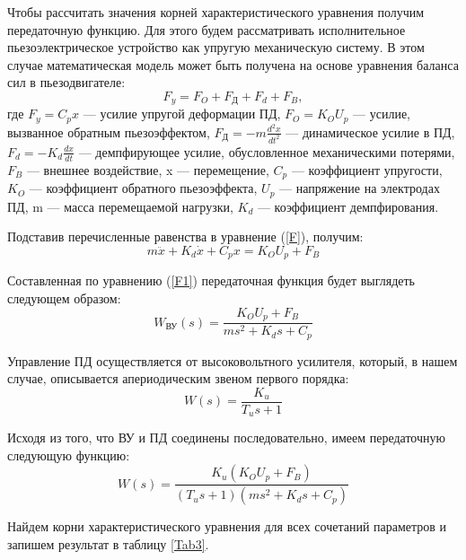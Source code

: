 \documentclass[a4paper,12pt]{article} %
\begin{document}
Чтобы рассчитать значения корней характеристического уравнения получим передаточную функцию. Для этого будем рассматривать исполнительное пьезоэлектрическое устройство как упругую механическую систему. В этом случае математическая модель может быть получена на основе уравнения баланса сил в пьезодвигателе:  
\begin{equation} 
    F_y = F_O + F_\text{Д} + F_d + F_B,
    \label{F}
\end{equation}
где $F_y=C_px$ --- усилие упругой деформации ПД, $F_O=K_OU_p$ --- усилие, вызванное обратным пьезоэффектом, $F_\text{Д}=-m\displaystyle{\frac{d^2x}{dt^2}}$ --- динамическое усилие в ПД, $F_d=-K_d\displaystyle{\frac{dx}{dt}}$ --- демпфирующее усилие, обусловленное механическими потерями, $F_B$ --- внешнее воздействие, x --- перемещение, $C_p$ --- коэффициент упругости, $K_O$ --- коэффициент обратного пьезоэффекта, $U_p$ --- напряжение на электродах ПД, m --- масса перемещаемой нагрузки, $K_d$ --- коэффициент демпфирования.\par
Подставив перечисленные равенства в уравнение (\ref{F}), получим:
\begin{equation} 
    m\ddot{x} + K_d\dot{x} + C_px = K_OU_p + F_B
    \label{F1}
\end{equation}
\par Составленная по уравнению (\ref{F1}) передаточная функция будет выглядеть следующем образом:
\begin{equation} 
    W_{\text{ВУ}}(s)=\frac{K_OU_p + F_B}{ms^2 + K_ds + C_p}
    \label{FVU}
\end{equation}
\par Управление ПД осуществляется от высоковольтного усилителя, который, в нашем случае, описывается апериодическим звеном первого порядка:
\begin{equation} 
    W(s)=\frac{K_u}{T_us + 1}
\end{equation}
\par Исходя из того, что ВУ и ПД соединены последовательно, имеем передаточную следующую функцию:
\begin{equation} 
    W(s)=\frac{K_u(K_OU_p + F_B)}{(T_us + 1)(ms^2 + K_ds + C_p)}
\end{equation}
\par Найдем корни характеристического уравнения для всех сочетаний параметров и запишем результат в таблицу \ref{Tab3}.

\newpage
\end{document}
